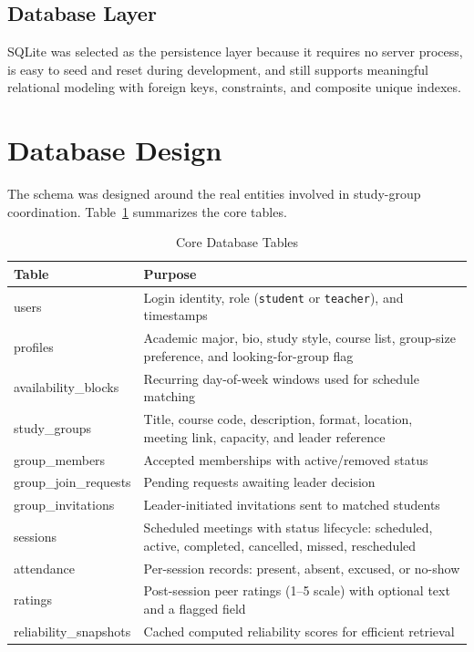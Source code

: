 \documentclass[conference]{IEEEtran}
\begin{document}
\subsection{Database Layer}
SQLite was selected as the persistence layer because it requires no server process, is easy to seed and reset during development, and still supports meaningful relational modeling with foreign keys, constraints, and composite unique indexes.

\section{Database Design}
The schema was designed around the real entities involved in study-group coordination. Table~\ref{tab:tables} summarizes the core tables.

\begin{table}[htbp]
\caption{Core Database Tables}
\label{tab:tables}
\begin{center}
\begin{tabular}{|>{\raggedright\arraybackslash}p{2.6cm}|>{\raggedright\arraybackslash}p{5.1cm}|}
\hline
\textbf{Table} & \textbf{Purpose} \\
\hline
users & Login identity, role (\texttt{student} or \texttt{teacher}), and timestamps \\
\hline
profiles & Academic major, bio, study style, course list, group-size preference, and looking-for-group flag \\
\hline
availability\_blocks & Recurring day-of-week windows used for schedule matching \\
\hline
study\_groups & Title, course code, description, format, location, meeting link, capacity, and leader reference \\
\hline
group\_members & Accepted memberships with active/removed status \\
\hline
group\_join\_requests & Pending requests awaiting leader decision \\
\hline
group\_invitations & Leader-initiated invitations sent to matched students \\
\hline
sessions & Scheduled meetings with status lifecycle: scheduled, active, completed, cancelled, missed, rescheduled \\
\hline
attendance & Per-session records: present, absent, excused, or no-show \\
\hline
ratings & Post-session peer ratings (1--5 scale) with optional text and a flagged field \\
\hline
reliability\_snapshots & Cached computed reliability scores for efficient retrieval \\
\hline
\end{tabular}
\end{center}
\end{table}
\end{document}
